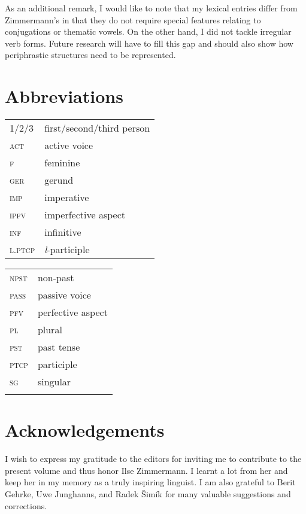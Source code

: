 \documentclass[output=paper,colorlinks,citecolor=brown,
]{langscibook}
\begin{document}
\largerpage[1] %

As an additional remark, I would like to note that my lexical entries differ from Zimmermann's in that they do not require special features relating to conjugations or thematic vowels. On the other hand, I did not tackle irregular verb forms. Future research will have to fill this gap and should also show how periphrastic structures need to be represented.

\section*{Abbreviations}
\begin{tabularx}{.47\textwidth}{lQ}
\textsc{1/2/3} & first/second/third person \\
\textsc{act} & active voice \\
\textsc{f} & feminine \\
\textsc{ger} & gerund \\
\textsc{imp} & imperative \\
\textsc{ipfv} & imperfective aspect \\
\textsc{inf} & infinitive \\
\textsc{l.ptcp} & \textit{l}-participle \\
\end{tabularx}
\begin{tabularx}{.44\textwidth}{lQ}
\textsc{npst} & non-past\\
\textsc{pass} & passive voice \\
\textsc{pfv} & perfective aspect \\
\textsc{pl} & plural \\
\textsc{pst} & past tense \\
\textsc{ptcp} & participle \\
\textsc{sg} & singular \\
& \\
\end{tabularx}

\section*{Acknowledgements}

I wish to express my gratitude to the editors for inviting me to contribute to the present volume and thus honor Ilse Zimmermann. I learnt a lot from her and keep her in my memory as a truly inspiring linguist. I am also grateful to Berit Gehrke, Uwe Junghanns, and Radek Šimík for many valuable suggestions and corrections.

\sloppy
\printbibliography[heading=subbibliography,notkeyword=this]


\end{document}
